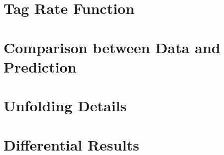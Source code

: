 \chapter{Tag Rate Function}
\label{app:trf}



\chapter{Comparison between Data and Prediction}
\label{app:selection}



\chapter{Unfolding Details}
\label{app:unfolding}



\chapter{Differential Results}
\label{app:correlations}


